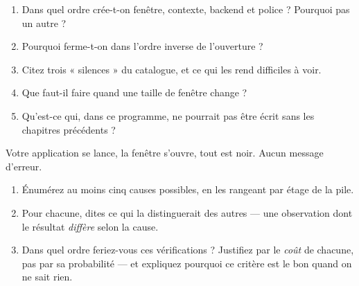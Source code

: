 \begin{nkquestions}
\begin{enumerate}
\item Dans quel ordre crée-t-on fenêtre, contexte, backend et police ? Pourquoi
      pas un autre ?
\item Pourquoi ferme-t-on dans l'ordre inverse de l'ouverture ?
\item Citez trois « silences » du catalogue, et ce qui les rend difficiles à
      voir.
\item Que faut-il faire quand une taille de fenêtre change ?
\item Qu'est-ce qui, dans ce programme, ne pourrait pas être écrit sans les
      chapitres précédents ?
\end{enumerate}
\end{nkquestions}

\begin{nklogique}
Votre application se lance, la fenêtre s'ouvre, tout est noir. Aucun message
d'erreur.

\begin{enumerate}
\item Énumérez au moins cinq causes possibles, en les rangeant par étage de la
      pile.
\item Pour chacune, dites ce qui la distinguerait des autres --- une observation
      dont le résultat \emph{diffère} selon la cause.
\item Dans quel ordre feriez-vous ces vérifications ? Justifiez par le
      \emph{coût} de chacune, pas par sa probabilité --- et expliquez pourquoi ce
      critère est le bon quand on ne sait rien.
\end{enumerate}
\end{nklogique}
